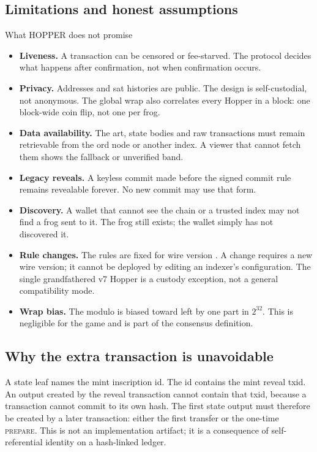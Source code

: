 \subsection{Limitations and honest assumptions}

\begin{warnbox}{What HOPPER does not promise}
\begin{itemize}[leftmargin=1.2em,itemsep=0.25em]
  \item \textbf{Liveness.} A transaction can be censored or fee-starved. The
        protocol decides what happens after confirmation, not when
        confirmation occurs.
  \item \textbf{Privacy.} Addresses and sat histories are public. The design
        is self-custodial, not anonymous. The global wrap also correlates
        every Hopper in a block: one block-wide coin flip, not one per frog.
  \item \textbf{Data availability.} The art, state bodies and raw
        transactions must remain retrievable from the ord node or another
        index. A viewer that cannot fetch them shows the fallback or
        unverified band.
  \item \textbf{Legacy reveals.} A keyless commit made before the signed
        commit rule remains revealable forever. No new commit may use that
        form.
  \item \textbf{Discovery.} A wallet that cannot see the chain or a trusted
        index may not find a frog sent to it. The frog still exists; the
        wallet simply has not discovered it.
  \item \textbf{Rule changes.} The rules are fixed for wire version
        . A change requires a new wire version; it cannot be
        deployed by editing an indexer's configuration. The single
        grandfathered v7 Hopper is a custody exception, not a general
        compatibility mode.
  \item \textbf{Wrap bias.} The modulo is biased toward left by one part in
        $2^{32}$. This is negligible for the game and is part of the
        consensus definition.
\end{itemize}
\end{warnbox}

\subsection{Why the extra transaction is unavoidable}

A state leaf names the mint inscription id. The id contains the mint reveal
txid. An output created by the reveal transaction cannot contain that txid,
because a transaction cannot commit to its own hash. The first state output
must therefore be created by a later transaction: either the first transfer
or the one-time \textsc{prepare}. This is not an implementation artifact; it
is a consequence of self-referential identity on a hash-linked ledger.


